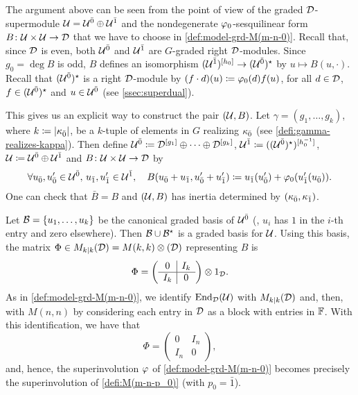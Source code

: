 The argument above can be seen from the point of view of the graded $\mathcal{D}$-supermodule $\mathcal U = \mathcal U^{\bar0} \oplus \mathcal U^{\bar1}$ and the nondegenerate $\varphi_0$-sesquilinear form $B\colon \mathcal U\times \mathcal U \to \mathcal{D}$ that we have to choose in \cref{def:model-grd-M(m-n-0)}. 
Recall that, since $\mathcal{D}$ is even, both $\mathcal U^{\bar0}$ and $\mathcal U^{\bar1}$ are $G$-graded right $\mathcal{D}$-modules. 
Since $g_0 = \deg B$ is odd, $B$ defines an isomorphism $(\mathcal U^{\bar1})^{[h_0]} \to (\mathcal U^{\bar0})^\star$ by $u \mapsto B(u, \cdot)$. 
Recall that $(\mathcal U^{\bar0})^\star$ is a right $\mathcal{D}$-module by $(f\cdot d) (u) \coloneqq \varphi_0(d) f(u)$, for all $d\in \mathcal{D}$, $f\in (\mathcal U^{\bar0})^\star$ and $u \in \mathcal U^{\bar0}$ (see \cref{ssec:superdual}).  

This gives us an explicit way to construct the pair $(\mathcal U, B)$. 
Let $\gamma = (g_1, \ldots, g_k)$, where $k \coloneqq |\kappa_{\bar{0}}|$, be a $k$-tuple of elements in $G$ 
realizing $\kappa_{\bar{0}}$ (see \cref{defi:gamma-realizes-kappa}). 
Then define $\mathcal U^{\bar0} \coloneqq \mathcal{D}^{[g_1]}\oplus \cdots \oplus \mathcal{D}^{[g_k]}$, $\mathcal U^{\bar1} \coloneqq ((\mathcal U^{\bar0})^\star)^{[h_0^{-1}]}$, $\mathcal U \coloneqq \mathcal U^{\bar0} \oplus \mathcal U^{\bar1}$ and $B\colon \mathcal U\times\mathcal U \to \mathcal{D}$ by
\[\label{eq:defi-B-for-P(n)}
    \forall u_{\bar{0}}, u_{\bar{0}}' \in \mathcal U^{\bar0}, \, u_{\bar{1}}, u_{\bar{1}}' \in \mathcal U^{\bar1}, \quad B(u_{\bar{0}} + u_{\bar{1}}, u_{\bar{0}}' + u_{\bar{1}}') \coloneqq u_{\bar{1}}(u_{\bar{0}}') + \varphi_0( u_{\bar{1}}' (u_{\bar{0}}) ).
\]
One can check that $\bar B = B$ and $(\mathcal U, B)$ has inertia determined by $(\kappa_{\bar{0}}, \kappa_{\bar{1}})$.

Let $\mathcal B = \{ u_1, \ldots, u_k \}$ be the canonical graded basis of $\mathcal U^{\bar0}$ (\ie, $u_i$ has $1$ in the $i$-th entry and zero elsewhere). 
Then $\mathcal B \cup \mathcal B^\star$ is a graded basis for $\mathcal U$. 
Using this basis, the matrix $\Phi \in M_{k|k}(\mathcal{D}) = M(k,k) \otimes (\mathcal{D})$ representing $B$ is 
\[
    \Phi = \left(\begin{array}{c|c}
            0 & I_{k}\\
            \hline
            I_{k} & 0
        \end{array}\right) \otimes 1_{\mathcal{D}}.
\]
As in \cref{def:model-grd-M(m-n-0)}, we identify $\operatorname{End}_{\mathcal{D}} (\mathcal U)$ with $M_{k|k}(\mathcal{D})$ and, then, with $M(n, n)$ by considering each entry in $\mathcal{D}$ as a block with entries in $\mathbb{F}$. 
With this identification, we have that
\[\label{eq:matrix-Phi-for-P}
    \Phi = 
    \left(\begin{array}{c|c}
            0 & I_{n}\\
            \hline
            I_{n} & 0
        \end{array}\right), 
\]
and, hence, the superinvolution $\varphi$ of \cref{def:model-grd-M(m-n-0)} becomes precisely the superinvolution of \cref{defi:M(m-n-p_0)} (with $p_0 = \bar 1$). 

